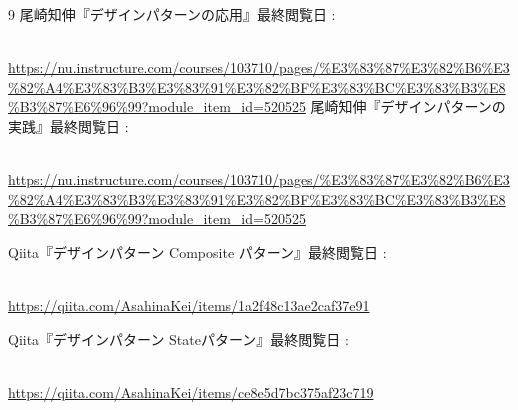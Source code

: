 \documentclass[dvipdfmx,a4paper,11pt]{jsarticle}
\begin{document}
\begin{thebibliography}{9}
 尾崎知伸『デザインパターンの応用』\hspace{1zw}最終閲覧日 : \date{\today}\\\url{https://nu.instructure.com/courses/103710/pages/%E3%83%87%E3%82%B6%E3%82%A4%E3%83%B3%E3%83%91%E3%82%BF%E3%83%BC%E3%83%B3%E8%B3%87%E6%96%99?module_item_id=520525}
 尾崎知伸『デザインパターンの実践』\hspace{1zw}最終閲覧日 : \date{\today}\\\url{https://nu.instructure.com/courses/103710/pages/%E3%83%87%E3%82%B6%E3%82%A4%E3%83%B3%E3%83%91%E3%82%BF%E3%83%BC%E3%83%B3%E8%B3%87%E6%96%99?module_item_id=520525}

 Qiita『デザインパターン Composite パターン』\hspace{1zw}最終閲覧日 : \date{\today}\\\url{https://qiita.com/AsahinaKei/items/1a2f48c13ae2caf37e91}

 Qiita『デザインパターン Stateパターン』\hspace{1zw}最終閲覧日 : \date{\today}\\\url{https://qiita.com/AsahinaKei/items/ce8e5d7bc375af23c719}
\end{thebibliography}

\appendix
\clearpage
\end{document}
